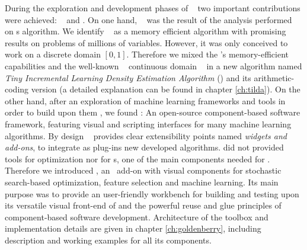 During the exploration and development phases of \WKII~ two important contributions were achieved: \TILDA~ and \GB. On one hand, \TILDA~ was the result of the analysis performed on \EDA s algorithm.  We identify \cGA~ as a memory efficient algorithm with promising results on problems of millions of variables.  However, it was only conceived to work on a discrete domain $[0,1]$.  Therefore  we mixed the \cGA 's memory-efficient capabilities and the well-known \PBILc~ continuous domain \EDA~ in a new algorithm named \emph{Tiny Incremental Learning Density Estimation Algorithm} (\TILDA) and its arithmetic-coding version \TILDAC (a detailed explanation can be found in chapter \ref{ch:tilda}). On the other hand, after an exploration of machine learning frameworks and tools in order to build upon them \WKII, we found \Orange: An open-source component-based software framework, featuring visual and scripting interfaces for many machine learning algorithms. By design \Orange~ provides clear extensibility points named \emph{widgets and add-ons}, to integrate as plug-ins new developed algorithms.  \Orange did not provided tools for optimization nor for \EDA s, one of the main components needed for \WKII . Therefore we introduced \GB, an \Orange~add-on with visual components for stochastic search-based optimization, feature selection and machine learning. Its main purpose was to provide an user-friendly workbench for building and testing  \WKII upon its versatile visual front-end of and the powerful reuse and glue principles of component-based software development. Architecture of the toolbox and implementation details are given in chapter \ref{ch:goldenberry}, including description and working examples for all its components. 